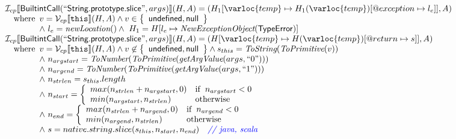 \[\begin{array}{l}
  
\I _{cp}\lbr \SF{BuiltintCall}(``\SF{String.prototype.slice}",args)\rbr(H,A)
 = (H_1[\varloc{temp}\mapsto H_1(\varloc{temp})[\varprop{exception}\mapsto l_e]], A) \\
\quad\wherec{
  v = \V _{cp}\lbr \TT{this}\rbr (H,A) \land v \in \set{\SF{undefined}, \SF{null}}\\
  \land\ l_e = \hf{newLocation}() \land\ H_1=H[l_e\mapsto\hf{NewExceptionObject}(\SF{TypeError})] 
  }\\
  
\I _{cp}\lbr \SF{BuiltintCall}(``\SF{String.prototype.slice}",args)\rbr(H,A)
 = (H[\varloc{temp}\mapsto H(\varloc{temp})[\varprop{return}\mapsto s]], A) \\
\quad\wherec{
  v = \V _{cp}\lbr \TT{this}\rbr (H,A) \land v \not\in \set{\SF{undefined}, \SF{null}}
  \land s_{this} = \hf{ToString}(\hf{ToPrimitive}(v))\\
  \land\ n_{argstart} = \hf{ToNumber}(\hf{ToPrimitive}(\hf{getArgValue}(args, ``0")))\\
  \land\ n_{argend} = \hf{ToNumber}(\hf{ToPrimitive}(\hf{getArgValue}(args, ``1")))\\
  \land\ n_{strlen} = s_{this}.length\\
  \land\ n_{start} = \left\{\begin{array}{ll}
      max(n_{strlen} + n_{argstart}, 0) & \ifc{n_{argstart} < 0} \\
      min(n_{argstart}, n_{strlen}) &  \owc
    \end{array}\right.\\
  \land\ n_{end} = \left\{\begin{array}{ll}
      max(n_{strlen} + n_{argend}, 0) & \ifc{n_{argend} < 0} \\
      min(n_{argend}, n_{strlen}) &  \owc
    \end{array}\right.\\
  \land\ s = native.string.slice(s_{this}, n_{start},n_{end}) \quad\comment{{\inblue // java, scala}}\\
  }\\
\end{array}
\]

